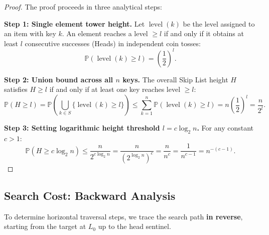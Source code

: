 \begin{proof}
The proof proceeds in three analytical steps:

\textbf{Step 1: Single element tower height.}
Let $\operatorname{level}(k)$ be the level assigned to an item with key $k$. An element reaches a level $\ge l$ if and only if it obtains at least $l$ consecutive successes (Heads) in independent coin tosses:
\begin{equation}
  \mathbb{P}(\operatorname{level}(k) \ge l) = \left(\frac{1}{2}\right)^l.
\end{equation}

\textbf{Step 2: Union bound across all $n$ keys.}
The overall Skip List height $H$ satisfies $H \ge l$ if and only if at least one key reaches level $\ge l$:
\begin{equation}
  \mathbb{P}(H \ge l) = \mathbb{P}\left(\bigcup_{k \in S} \{\operatorname{level}(k) \ge l\}\right) \le \sum_{k=1}^n \mathbb{P}(\operatorname{level}(k) \ge l) = n \left(\frac{1}{2}\right)^l = \frac{n}{2^l}.
\end{equation}

\textbf{Step 3: Setting logarithmic height threshold $l = c \log_2 n$.}
For any constant $c > 1$:
\begin{equation}
  \mathbb{P}(H \ge c \log_2 n) \le \frac{n}{2^{c \log_2 n}} = \frac{n}{\left(2^{\log_2 n}\right)^c} = \frac{n}{n^c} = \frac{1}{n^{c-1}} = n^{-(c-1)}.
\end{equation}
\end{proof}

\subsection{Search Cost: Backward Analysis}
To determine horizontal traversal steps, we trace the search path \textbf{in reverse}, starting from the target at $L_0$ up to the head sentinel.


